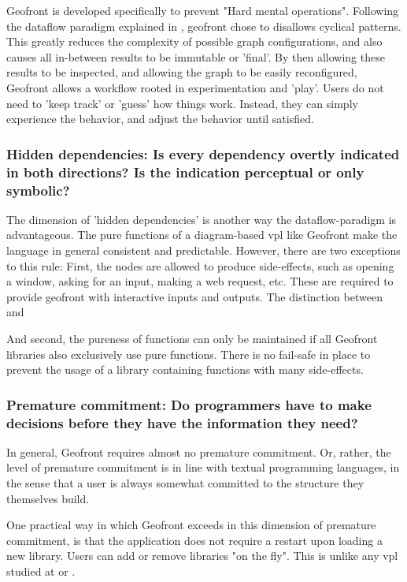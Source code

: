 Geofront is developed specifically to prevent "Hard mental operations".
Following the dataflow paradigm explained in , geofront chose to disallows cyclical patterns. 
This greatly reduces the complexity of possible graph configurations, and also causes all in-between results to be immutable or 'final'.
By then allowing these results to be inspected, and allowing the graph to be easily reconfigured, Geofront allows a workflow rooted in experimentation and 'play'.
Users do not need to 'keep track' or 'guess' how things work.
Instead, they can simply experience the behavior, and adjust the behavior until satisfied. 



\subsubsection*{Hidden dependencies: Is every dependency overtly indicated in both directions? Is the indication perceptual or only symbolic?}

The dimension of 'hidden dependencies' is another way the dataflow-paradigm is advantageous. 
The pure functions of a diagram-based vpl like Geofront make the language in general consistent and predictable.
However, there are two exceptions to this rule:
First, the  nodes are allowed to produce side-effects, such as opening a window, asking for an input, making a web request, etc. 
These are required to provide geofront with interactive inputs and outputs.
The distinction between  and \m{}

And second, the pureness of functions can only be maintained if all Geofront libraries also exclusively use pure functions. 
There is no fail-safe in place to prevent the usage of a library containing functions with many side-effects. 

\subsubsection*{Premature commitment: Do programmers have to make decisions before they have the information they need?}

In general, Geofront requires almost no premature commitment. 
Or, rather, the level of premature commitment is in line with textual programming languages, in the sense that a user is always somewhat committed to the structure they themselves build. 

One practical way in which Geofront exceeds in this dimension of premature commitment, is that the application does not require a restart upon loading a new library. 
Users can add or remove libraries "on the fly". 
This is unlike any vpl studied at  or .

